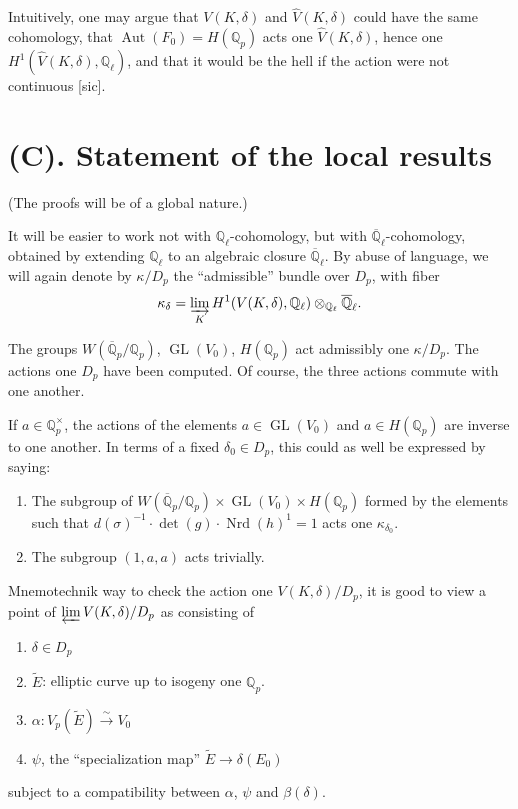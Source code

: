 \documentclass[11pt,a4paper]{article}
\theoremstyle{plain}
\theoremstyle{definition}
\theoremstyle{remark}
\DeclareMathOperator{\Aut}{Aut}
\DeclareMathOperator{\GL}{GL}
\DeclareMathOperator{\Nrd}{Nrd}
\newcommand{\Qpbar}{\overline{\mathbb{Q}}_{p}}
\newcommand{\Qp}{\mathbb{Q}_{p}}
\newcommand{\Ql}{\mathbb{Q}_{\ell}}
\newcommand{\Qlbar}{\overline{\mathbb{Q}}_{\ell}}
\newcommand{\Vp}{V_{p}}
\begin{document}
Intuitively, one may argue that $V(K, \delta)$ and $\widehat{V}(K, \delta)$ could have the same cohomology, that $\Aut(F_{0}) = H(\Qp)$ acts one $\widehat{V}(K, \delta)$, hence one $H^{1}(\widehat{V}(K, \delta), \Ql)$, and that it would be the hell if the action were not continuous [sic].


\section*{(C). Statement of the local results}

(The proofs will be of a global nature.)

It will be easier to work not with $\Ql$-cohomology, but with $\Qlbar$-cohomology, obtained by extending $\Ql$ to an algebraic closure $\Qlbar$. By abuse of language, we will again denote by $\kappa/D_{p}$ the ``admissible'' bundle over $D_{p}$, with fiber
\[
\kappa_{\delta} = \varinjlim_{K} H^{1}(V(K, \delta), \Ql) \otimes_{\Ql} \Qlbar.
\]

The groups $W(\Qpbar/\Qp)$, $\GL(V_{0})$, $H(\Qp)$ act admissibly one $\kappa/D_{p}$. The actions one $D_{p}$ have been computed. Of course, the three actions commute with one another.

If $a \in \Qp^{\times}$, the actions of the elements $a \in \GL(V_{0})$ and $a \in H(\Qp)$ are inverse to one another. In terms of a fixed $\delta_{0} \in D_{p}$, this could as well be expressed by saying:
\begin{enumerate}[label=(\alph*)]
\item The subgroup of $W(\Qpbar/\Qp) \times \GL(V_{0}) \times H(\Qp)$ formed by the elements such that $d(\sigma)^{-1} \cdot \det(g) \cdot \Nrd(h)^{1} = 1$ acts one $\kappa_{\delta_{0}}$.
\item The subgroup $(1, a, a)$ acts trivially.
\end{enumerate}

Mnemotechnik way to check the action one $V(K, \delta)/D_{p}$, it is good to view a point of $\varprojlim V(K, \delta)/D_{p}$ as consisting of
\begin{enumerate}[label=(\alph*)]
\item $\delta \in D_{p}$
\item $\widetilde{E}$: elliptic curve up to isogeny one $\Qp$.
\item $\alpha : \Vp(\widetilde{E}) \xrightarrow{\sim} V_{0}$
\item $\psi$, the ``specialization map'' $\widetilde{E} \to \delta(E_{0})$
\end{enumerate}
subject to a compatibility between $\alpha$, $\psi$ and $\beta(\delta)$.
\end{document}
